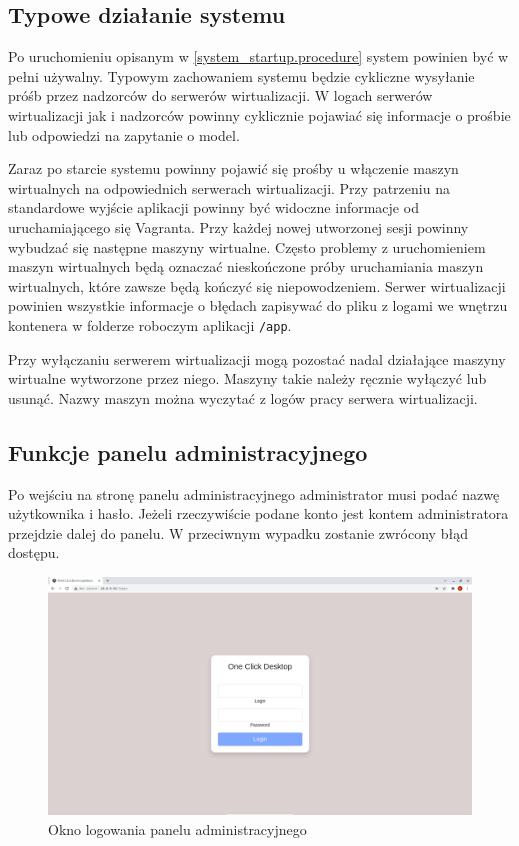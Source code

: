\documentclass[../opis-rozwiazania.tex]{subfiles}
\begin{document}
\label{system_interaction}

\subsection{Typowe działanie systemu}
Po uruchomieniu opisanym w \ref{system_startup.procedure} system powinien być w pełni używalny.
Typowym zachowaniem systemu będzie cykliczne wysyłanie próśb przez nadzorców do serwerów wirtualizacji.
W logach serwerów wirtualizacji jak i nadzorców powinny cyklicznie pojawiać się informacje o prośbie lub odpowiedzi na zapytanie o model.

Zaraz po starcie systemu powinny pojawić się prośby u włączenie maszyn wirtualnych na odpowiednich serwerach wirtualizacji.
Przy patrzeniu na standardowe wyjście aplikacji powinny być widoczne informacje od uruchamiającego się Vagranta.
Przy każdej nowej utworzonej sesji powinny wybudzać się następne maszyny wirtualne.
Często problemy z uruchomieniem maszyn wirtualnych będą oznaczać nieskończone próby uruchamiania maszyn wirtualnych, które zawsze będą kończyć się niepowodzeniem.
Serwer wirtualizacji powinien wszystkie informacje o błędach zapisywać do pliku z logami we wnętrzu kontenera w folderze roboczym aplikacji \texttt{/app}.

Przy wyłączaniu serwerem wirtualizacji mogą pozostać nadal działające maszyny wirtualne wytworzone przez niego.
Maszyny takie należy ręcznie wyłączyć lub usunąć.
Nazwy maszyn można wyczytać z logów pracy serwera wirtualizacji.

\subsection{Funkcje panelu administracyjnego}

Po wejściu na stronę panelu administracyjnego administrator musi podać nazwę użytkownika i hasło.
Jeżeli rzeczywiście podane konto jest kontem administratora przejdzie dalej do panelu.
W przeciwnym wypadku zostanie zwrócony błąd dostępu.

\begin{figure}[H]
	\centering
	\includegraphics[width=\textwidth]{resources/admin_panel_login.png}
	\caption{Okno logowania panelu administracyjnego}
	\label{figure:system_interaction.admin.login}
\end{figure}
\end{document}
